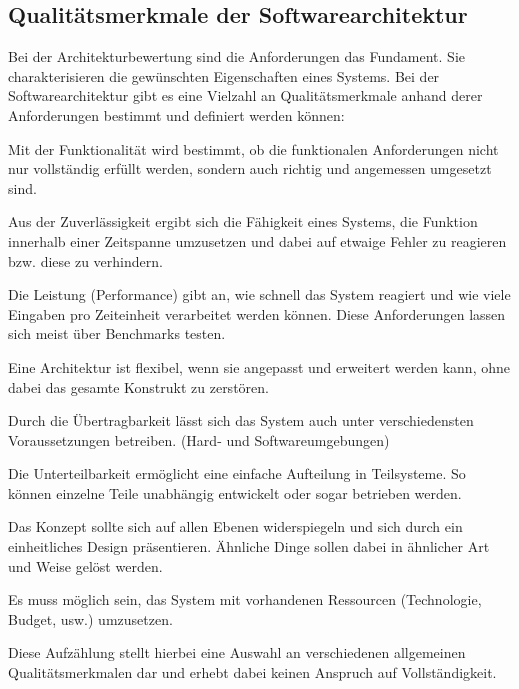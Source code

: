 \subsection{Qualitätsmerkmale der Softwarearchitektur}

Bei der Architekturbewertung sind die Anforderungen das Fundament. Sie charakterisieren die 
gewünschten Eigenschaften eines Systems\cite{Starke2015}.
Bei der Softwarearchitektur gibt es eine Vielzahl an Qualitätsmerkmale anhand derer Anforderungen bestimmt und definiert werden können\cites{Starke2015}{Clements2000}:

\begin{description}[leftmargin=!,labelwidth=\widthof{\bfseries Konzeptuelle Integrität}]
	\item[Funktionalität] 
	Mit der Funktionalität wird bestimmt, ob die funktionalen Anforderungen nicht nur vollständig erfüllt werden, sondern auch richtig und angemessen umgesetzt sind.
	\item[Zuverlässigkeit] 
	Aus der Zuverlässigkeit ergibt sich die Fähigkeit eines Systems, die Funktion innerhalb einer Zeitspanne umzusetzen und
	dabei auf etwaige Fehler zu reagieren bzw. diese zu verhindern.
	\item[Leistung] 
	Die Leistung (Performance) gibt an, wie schnell das System reagiert und wie viele Eingaben pro Zeiteinheit verarbeitet werden können. Diese Anforderungen
	lassen sich meist über Benchmarks testen.
	\item[Flexibilität] 
	Eine Architektur ist flexibel, wenn sie angepasst und erweitert werden kann, ohne dabei das gesamte Konstrukt zu zerstören.
	\item[Übertragbarkeit] 
	Durch die Übertragbarkeit lässt sich das System auch unter verschiedensten Voraussetzungen betreiben. (Hard- und Softwareumgebungen) 
	\item[Unterteilbarkeit]
	Die Unterteilbarkeit ermöglicht eine einfache Aufteilung in Teilsysteme. So können einzelne Teile unabhängig entwickelt oder sogar betrieben werden.
	\item[Konzeptuelle Integrität] 
	Das Konzept sollte sich auf allen Ebenen widerspiegeln und sich durch ein einheitliches Design präsentieren. Ähnliche Dinge sollen dabei in ähnlicher Art und Weise gelöst werden. 
	\item[Machbarkeit] 
	Es muss möglich sein, das System mit vorhandenen Ressourcen (Technologie, Budget, usw.) umzusetzen.
\end{description}

Diese Aufzählung stellt hierbei eine Auswahl an verschiedenen allgemeinen Qualitätsmerkmalen dar und erhebt dabei keinen Anspruch auf Vollständigkeit.

